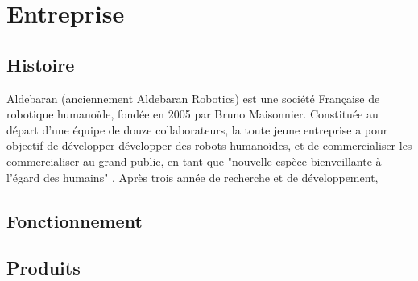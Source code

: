 \chapter*{Entreprise}
\label{Entreprise}
\thispagestyle{fancy}

\section{Histoire}
\label{Entreprise: histoire}
Aldebaran (anciennement Aldebaran Robotics) est une société Française de robotique humanoïde, fondée en 2005 par Bruno Maisonnier. 
Constituée au départ d'une équipe de douze collaborateurs, la toute jeune entreprise a pour objectif de développer développer des robots humanoïdes, et de commercialiser les commercialiser au grand public, en tant que "nouvelle espèce bienveillante à l'égard des humains" . Après trois année de recherche et de développement, 

\section{Fonctionnement}

\section{Produits}